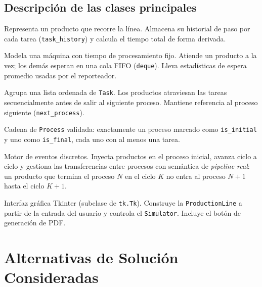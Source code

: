 \documentclass[12pt,letterpaper]{article}
\begin{document}
\subsection{Descripción de las clases principales}

\begin{description}[leftmargin=2em, labelindent=0em]
  \item[\texttt{Product}] Representa un producto que recorre la línea. Almacena
    su historial de paso por cada tarea (\texttt{task\_history}) y calcula el
    tiempo total de forma derivada.

  \item[\texttt{Task}] Modela una máquina con tiempo de procesamiento fijo. Atiende
    un producto a la vez; los demás esperan en una cola FIFO (\texttt{deque}).
    Lleva estadísticas de espera promedio usadas por el reporteador.

  \item[\texttt{Process}] Agrupa una lista ordenada de \texttt{Task}. Los productos
    atraviesan las tareas secuencialmente antes de salir al siguiente proceso.
    Mantiene referencia al proceso siguiente (\texttt{next\_process}).

  \item[\texttt{ProductionLine}] Cadena de \texttt{Process} validada: exactamente un
    proceso marcado como \texttt{is\_initial} y uno como \texttt{is\_final},
    cada uno con al menos una tarea.

  \item[\texttt{Simulator}] Motor de eventos discretos. Inyecta productos en el
    proceso inicial, avanza ciclo a ciclo y gestiona las transferencias entre
    procesos con semántica de \emph{pipeline real}: un producto que termina el
    proceso $N$ en el ciclo $K$ no entra al proceso $N+1$ hasta el ciclo $K+1$.

  \item[\texttt{LinProdApp}] Interfaz gráfica Tkinter (subclase de \texttt{tk.Tk}).
    Construye la \texttt{ProductionLine} a partir de la entrada del usuario y
    controla el \texttt{Simulator}. Incluye el botón de generación de PDF.
\end{description}

\section{Alternativas de Solución Consideradas}
\end{document}
